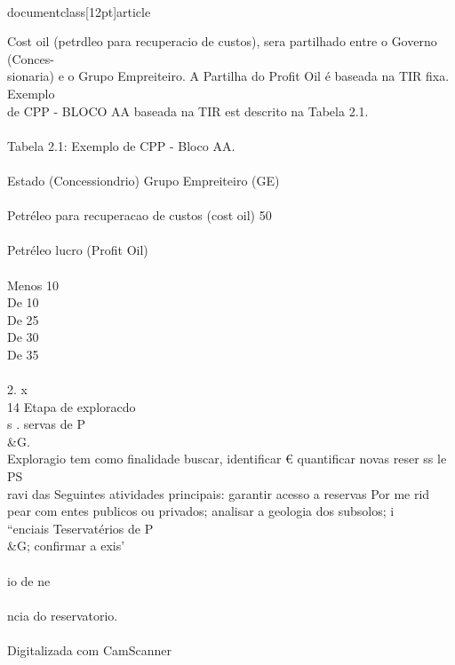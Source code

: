 \\documentclass[12pt]{article}
\begin{document}
Cost oil (petrdleo para recuperacio de custos), sera partilhado entre o Governo (Conces-\\
sionaria) e o Grupo Empreiteiro. A Partilha do Profit Oil é baseada na TIR fixa. Exemplo\\
de CPP - BLOCO AA baseada na TIR est descrito na Tabela 2.1.\\
\\
Tabela 2.1: Exemplo de CPP - Bloco AA.\\
\\
Estado (Concessiondrio) Grupo Empreiteiro (GE)\\
\\
Petréleo para recuperacao de custos (cost oil) 50\\%
\\
Petréleo lucro (Profit Oil)\\
\\
Menos 10\\%
De 10\\%
De 25\\%
De 30\\%
De 35\\%
\\
2. x\\
14 Etapa de exploracdo\\
s . servas de P\\&G.\\
Exploragio tem como finalidade buscar, identificar € quantificar novas reser ss le PS\\
ravi das Seguintes atividades principais: garantir acesso a reservas Por me rid\\
pear com entes publicos ou privados; analisar a geologia dos subsolos; i\\
“enciais Teservatérios de P\\&G; confirmar a exis'\\
\\
io de ne\\
\\
ncia do reservatorio.\\
\\
Digitalizada com CamScanner\\
\end{document}
